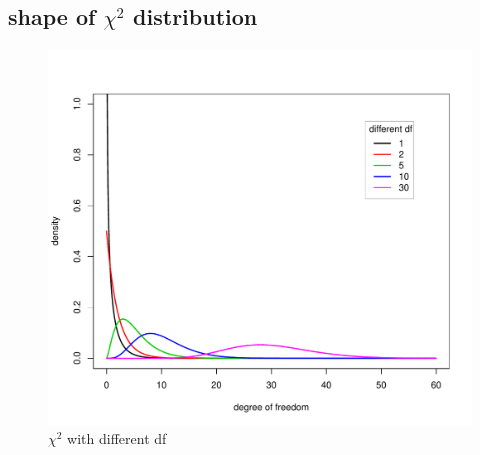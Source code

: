 \documentclass{book}
\begin{document}
\subsection{shape of $\chi^{2}$ distribution}

\begin{figure}[!htbp]
\centering
\includegraphics[width=0.6\teXtwidth]{./graph/chisq.pdf}
\caption{$\chi^{2}$ with different df}\label{fig:/graph/chisq.pdf}
\end{figure}
\end{document}
